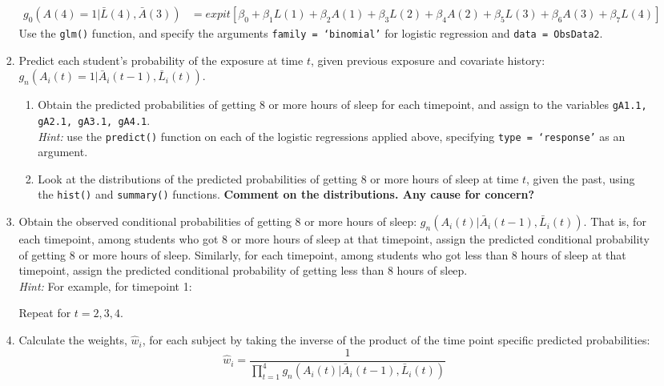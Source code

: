 \documentclass[answers]{exam}
\begin{document}
\begin{enumerate}
\begin{enumerate}
\begin{enumerate}
\begin{align*}
g_0(A(4)=1|\bar{L}(4), \bar{A}(3)) & = expit[\beta_0 + \beta_1L(1) + \beta_2A(1) + \beta_3L(2) + \beta_4A(2) + \beta_5L(3) + \beta_6A(3) + \beta_7L(4)]
\end{align*}
Use the \texttt{glm()} function, and specify the arguments \texttt{family = `binomial'} for logistic regression and \texttt{data = ObsData2}.
\item Predict each student's probability of the exposure at time $t$, given previous exposure and covariate history: $g_n(A_i(t)=1|\bar{A}_i(t-1), \bar{L}_i(t))$.
\begin{enumerate}
\item Obtain the predicted probabilities of getting 8 or more hours of sleep for each timepoint, and assign to the variables \texttt{gA1.1, gA2.1, gA3.1, gA4.1}. \\
\textit{Hint:} use the \texttt{predict()} function on each of the logistic regressions applied above, specifying \texttt{type = `response'} as an argument.
\item Look at the distributions of the predicted probabilities of getting 8 or more hours of sleep at time $t$, given the past, using the \texttt{hist()} and \texttt{summary()} functions. \textbf{Comment on the distributions. Any cause for concern?}
\end{enumerate}
\item Obtain the observed conditional probabilities of getting 8 or more hours of sleep: $g_n(A_i(t)|\bar{A}_i(t-1), \bar{L}_i(t))$. That is, for each timepoint, among students who got 8 or more hours of sleep at that timepoint, assign the predicted conditional probability of getting 8 or more hours of sleep. Similarly, for each timepoint, among students who got less than 8 hours of sleep at that timepoint, assign the predicted conditional probability of getting less than 8 hours of sleep.\\
\textit{Hint:} For example, for timepoint 1:
\begin{Schunk}
\end{Schunk}
Repeat for $t = 2, 3, 4$.
\item Calculate the weights, $_i$, for each subject by taking the inverse of the product of the time point specific predicted probabilities: 
\[
\hat{w}_i = \frac{1}{\prod_{t=1}^4g_n(A_i(t)|\bar{A}_i(t-1), \bar{L}_i(t))}
\]
\end{enumerate}
\end{enumerate}
\end{enumerate}
\end{document}
